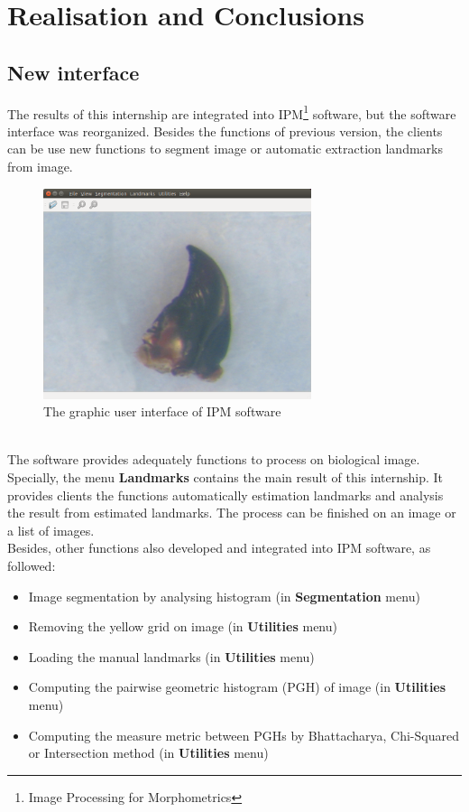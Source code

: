 \chapter{Realisation and Conclusions}
\section{New interface}
The results of this internship are integrated into IPM\footnote{Image Processing for Morphometrics} software, but the software interface was reorganized. Besides the functions of previous version, the clients can be use new functions to segment image or automatic extraction landmarks from image.
\begin{figure}[h!]
\centering
\includegraphics[width=0.7\textwidth]{./images/software}
\caption{The graphic user interface of IPM software}
\label{fig:figure_31}
\end{figure}~\\
The software provides adequately functions to process on biological image. Specially, the menu \textbf{Landmarks} contains the main result of this internship. It provides clients the functions automatically estimation landmarks and analysis the result from estimated landmarks. The process can be finished on an image or a list of images.\\
Besides, other functions also developed and integrated into IPM software, as followed:
\begin{itemize}
\item Image segmentation by analysing histogram (in \textbf{Segmentation} menu)
\item Removing the yellow grid on image (in \textbf{Utilities} menu)
\item Loading the manual landmarks (in \textbf{Utilities} menu)
\item Computing the pairwise geometric histogram (PGH) of image (in \textbf{Utilities} menu)
\item Computing the measure metric between PGHs by Bhattacharya, Chi-Squared or Intersection method (in \textbf{Utilities} menu)
\end{itemize}
